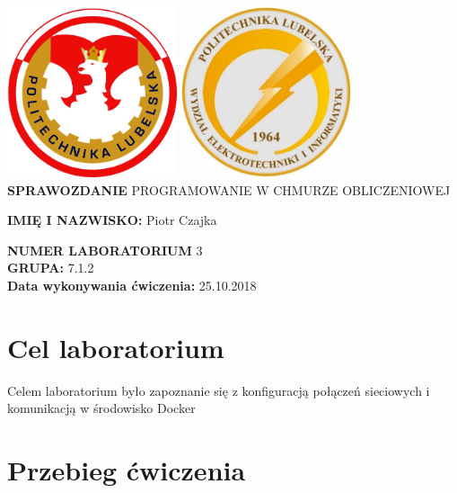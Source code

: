 \documentclass[12pt]{article}
\begin{document}
    \centering
    \includegraphics[width=5cm, height=5cm,]{herbPL.jpg}
    \hspace{2cm}
    \includegraphics[width=5cm, height=5cm]{herbWEII.jpg}\\
    \vspace{2cm}
    {\Huge \textbf{SPRAWOZDANIE}}
    \vspace{2cm}
    \newline
    {\large PROGRAMOWANIE W CHMURZE OBLICZENIOWEJ}
    \vfill
    \raggedright
    \textbf{IMIĘ I NAZWISKO:} Piotr Czajka

    \textbf{NUMER LABORATORIUM} 3\\
    \textbf{GRUPA:} 7.1.2\\
    \textbf{Data wykonywania ćwiczenia:} 25.10.2018\\

    \newpage

    \tableofcontents{}

    \newpage

    \section{Cel laboratorium}
    Celem laboratorium było zapoznanie się z konfiguracją połączeń sieciowych i komunikacją w środowisko Docker\\

    \section{Przebieg ćwiczenia}
\end{document}
